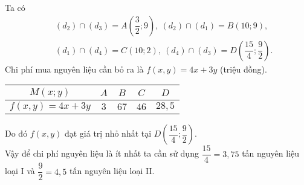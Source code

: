 \begin{bt}
{\begin{center}
		\end{center}
		Ta có 
		{\allowdisplaybreaks
			\begin{eqnarray*}
				&&(d_2) \cap (d_3)=A\left(\dfrac{3}{2};9\right),\ (d_2) \cap (d_1)=B(10;9),\\
				&&(d_1) \cap (d_4)=C(10;2),\ (d_4) \cap (d_3)=D\left(\dfrac{15}{4};\dfrac{9}{2}\right).
			\end{eqnarray*}
		}
		Chi phí mua nguyên liệu cần bỏ ra là $f(x,y)=4x+3y$ (triệu đồng).
		\begin{center}
			\renewcommand\arraystretch{1.6}
			\renewcommand{\tabcolsep}{6mm}
			\begin{tabular}{|c|c|c|c|c|}
				\hline 
				$M(x;y)$& $A$ & $B$ & $C$ & $D$ \\ 
				\hline 
				$f(x,y)=4x+3y$& $3$ & $67$ & $46$ & $28{,}5$ \\
				\hline 
			\end{tabular} 
		\end{center}
		Do đó $f(x,y)$ đạt giá trị nhỏ nhất tại $D\left(\dfrac{15}{4};\dfrac{9}{2}\right)$.\\
		Vậy để chi phí nguyên liệu là ít nhất ta cần sử dụng $\dfrac{15}{4}=3{,}75$ tấn nguyên liệu loại I và $\dfrac{9}{2}=4{,}5$ tấn nguyên liệu loại II.
	}
\end{bt}

